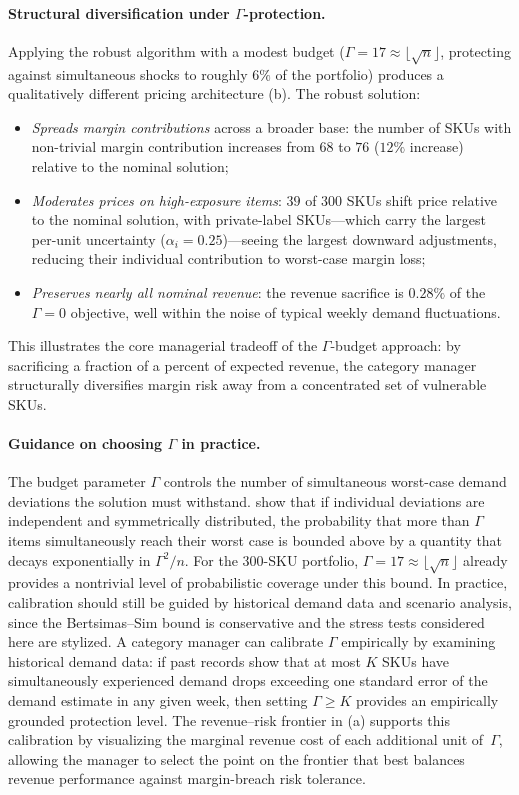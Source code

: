\documentclass[11pt, a4paper]{article}
\theoremstyle{plain}
\theoremstyle{definition}
\theoremstyle{remark}
\begin{document}
\paragraph{Structural diversification under $\Gamma$-protection.}
Applying the robust algorithm with a modest budget ($\Gamma=17\approx\lfloor\sqrt{n}\rfloor$,
protecting against simultaneous shocks to roughly $6\%$ of the portfolio) produces a
qualitatively different pricing architecture (b). The robust solution:
\begin{itemize}
\item \emph{Spreads margin contributions} across a broader base: the number of SKUs with
  non-trivial margin contribution increases from $68$ to $76$ ($12\%$ increase) relative to
  the nominal solution;
\item \emph{Moderates prices on high-exposure items}: $39$ of $300$ SKUs shift price relative
  to the nominal solution, with private-label SKUs---which carry the largest per-unit
  uncertainty ($\alpha_i=0.25$)---seeing the largest downward adjustments, reducing their
  individual contribution to worst-case margin loss;
\item \emph{Preserves nearly all nominal revenue}: the revenue sacrifice is $0.28\%$ of the
  $\Gamma=0$ objective, well within the noise of typical weekly demand fluctuations.
\end{itemize}
This illustrates the core managerial tradeoff of the $\Gamma$-budget approach: by sacrificing
a fraction of a percent of expected revenue, the category manager structurally diversifies
margin risk away from a concentrated set of vulnerable SKUs.

\paragraph{Guidance on choosing $\Gamma$ in practice.}
The budget parameter $\Gamma$ controls the number of simultaneous worst-case demand deviations the solution must withstand. \citet{BertsimasSim2004} show that if individual deviations are independent and symmetrically distributed, the probability that more than $\Gamma$ items simultaneously reach their worst case is bounded above by a quantity that decays exponentially in $\Gamma^2/n$. For the $300$-SKU portfolio, $\Gamma=17\approx\lfloor\sqrt{n}\rfloor$ already provides a nontrivial level of probabilistic coverage under this bound. In practice, calibration should still be guided by historical demand data and scenario analysis, since the Bertsimas--Sim bound is conservative and the stress tests considered here are stylized. A category manager can calibrate $\Gamma$ empirically by examining historical demand data: if past records show that at most $K$ SKUs have simultaneously experienced demand drops exceeding one standard error of the demand estimate in any given week, then setting $\Gamma \geq K$ provides an empirically grounded protection level. The revenue--risk frontier in (a) supports this calibration by visualizing the marginal revenue cost of each additional unit of~$\Gamma$, allowing the manager to select the point on the frontier that best balances revenue performance against margin-breach risk tolerance.
\end{document}
